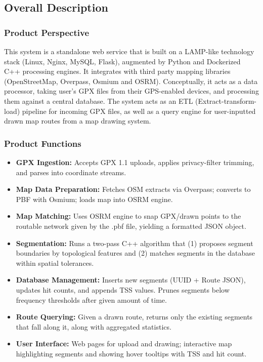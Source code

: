 \documentclass[11pt,twoside]{report}
\begin{document}
\subsection{Overall Description}
\label{sec:overview}
\subsubsection{Product Perspective}
This system is a standalone web service that is built on a LAMP-like technology stack (Linux, Nginx, MySQL, Flask), augmented by Python and Dockerized C++ processing engines.
It integrates with third party mapping libraries (OpenStreetMap, Overpass, Osmium and OSRM). Conceptually, it acts as a data processor, taking user's GPX files from their GPS-enabled devices,
and processing them against a central database. The system acts as an ETL (Extract-transform-load) pipeline for incoming GPX files, as well as a query engine
for user-inputted drawn map routes from a map drawing system.

\subsubsection{Product Functions}
\begin{itemize}
	\item \textbf{GPX Ingestion:} Accepts GPX 1.1 uploads, applies privacy-filter trimming, and parses into coordinate streams.
	\item \textbf{Map Data Preparation:} Fetches OSM extracts via Overpass; converts to PBF with Osmium; loads map into OSRM engine.
	\item \textbf{Map Matching:} Uses OSRM engine to snap GPX/drawn points to the routable network given by the .pbf file, yielding a formatted JSON object.
	\item \textbf{Segmentation:} Runs a two-pass C++ algorithm that (1) proposes segment boundaries by topological features and (2) matches segments in the database within spatial tolerances.
	\item \textbf{Database Management:} Inserts new segments (UUID + Route JSON), updates hit counts, and appends TSS values. Prunes segments below frequency thresholds after given amount of time.
	\item \textbf{Route Querying:} Given a drawn route, returns only the existing segments that fall along it, along with aggregated statistics.
	\item \textbf{User Interface:} Web pages for upload and drawing; interactive map highlighting segments and showing hover tooltips with TSS and hit count.
\end{itemize}
\end{document}
